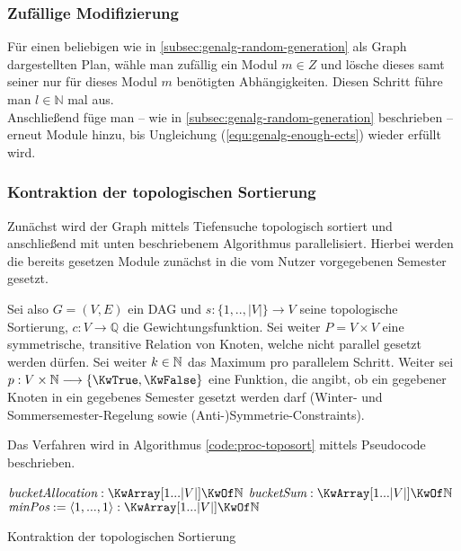 \subsubsection{Zufällige Modifizierung}
\label{subsec:genalg-random-modification}
Für einen beliebigen wie in \ref{subsec:genalg-random-generation} als Graph dargestellten Plan, wähle man zufällig ein Modul $m \in Z$ und lösche dieses samt seiner nur für dieses Modul $m$ benötigten Abhängigkeiten. Diesen Schritt führe man $l \in \mathbb{N}$ mal aus.\\
Anschließend füge man -- wie in \ref{subsec:genalg-random-generation} beschrieben -- erneut Module hinzu, bis Ungleichung (\ref{equ:genalg-enough-ects}) wieder erfüllt wird.

\subsubsection{Kontraktion der topologischen Sortierung}
\label{subsec:genalg-contract-topolog-sort}
Zunächst wird der Graph mittels Tiefensuche topologisch sortiert und
anschließend  mit unten beschriebenem Algorithmus parallelisiert.
Hierbei werden die bereits gesetzen Module zunächst in die vom Nutzer vorgegebenen Semester gesetzt.

Sei also $G = (V,E)$ ein DAG und $s: \{1,..,|V|\} \to V$ seine topologische Sortierung, $c: V \to \mathbb{Q}$ die Gewichtungsfunktion. Sei weiter $P = V \times V$ eine symmetrische, transitive Relation von Knoten, welche nicht parallel gesetzt werden dürfen.
Sei weiter $ k \in \mathbb{N} $ das Maximum pro parallelem Schritt.
Weiter sei $ p: V \times \NN \to \{\KwTrue, \KwFalse\} $ eine Funktion, die angibt, ob ein gegebener Knoten in ein gegebenes Semester gesetzt werden darf (Winter- und Sommersemester-Regelung sowie (Anti-)Symmetrie-Constraints).

Das Verfahren wird in Algorithmus \ref{code:proc-toposort} mittels Pseudocode beschrieben.

\begin{algorithm}[H]
	\label{code:proc-toposort}
	$\Var{bucketAllocation} : \KwArray [1...|V|] \KwOf \NN $ \;
	$\Var{bucketSum} : \KwArray [1...|V|] \KwOf \NN $ \;
	$\Var{minPos} := \langle 1,...,1 \rangle: \KwArray [1...|V|] \KwOf \NN $ \;
	\BlankLine
	\caption{Kontraktion der topologischen Sortierung}
\end{algorithm}
	


